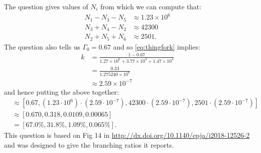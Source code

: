 \begin{allparts}
{\noindent The question gives values of $N_i$ from which we can compute that:
\begin{align}
N_1-N_3-N_5&\approx 1.23\times10^6
\\
N_3+N_4-N_2&\approx 42300 
\\
N_2+N_5+N_6&\approx 2501.
\end{align}
The question also tells us $\Gamma_0=0.67$ and so \eqref{eq:thingfork} implies:
\begin{align}
k
&=
\frac{1-0.67}{1.27\times 10^6+3.77\times10^3+1.47\times 10^3}\nonumber
\\
&=\frac{0.33}{1.275240\times 10^6}\nonumber
\\
&\approx 2.59\times 10^{-7}\nonumber
\end{align}
and hence putting the above together:
\begin{align}
[\Gamma_0,\Gamma_1 , \Gamma_2 , \Gamma_3]
&\approx
[0.67,
( 1.23\cdot 10^6)\cdot (2.59\cdot 10^{-7}), 42300 \cdot (2.59\cdot 10^{-7}), 2501\cdot (2.59\cdot 10^{-7})
]\nonumber
\\
&\approx
[0.670,
0.318, 0.0109, 0.00065]\nonumber
\\
&=
[67.0\%, 31.8\%, 1.09\%, 0.065\%]. \nonumber
\end{align}
This question is based on Fig 14 in  \url{http://dx.doi.org/10.1140/epja/i2018-12526-2} and was designed to give the branching ratios it reports.
}


\end{allparts}

